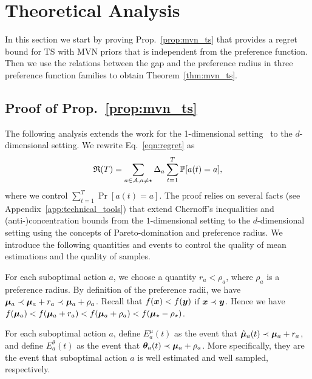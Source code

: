 
\section{Theoretical Analysis}
\label{sec:analysis}

In this section we start by proving Prop.~\ref{prop:mvn_ts} that provides a regret bound for TS with MVN priors that is independent from the preference function. Then we use the relations between the gap and the preference radius in three preference function families to obtain Theorem~\ref{thm:mvn_ts}.

\subsection{Proof of Prop.~\ref{prop:mvn_ts}}

The following analysis extends the work for the 1-dimensional setting~\cite{Agrawal2013} to the $d$-dimensional setting. We rewrite Eq.~\ref{eqn:regret} as
\begin{align*}
    \mathfrak{R}(T) = \sum_{a \in \mathcal{A}, a \neq \star} \Delta_a \sum_{t = 1}^T \mathbb{P}[a(t) = a],
\end{align*}
where we control $\sum_{t = 1}^T \Pr[a(t) = a]$. The proof relies on several facts (see Appendix~\ref{app:technical_tools}) that extend Chernoff's inequalities and (anti-)concentration bounds from the $1$-dimensional setting to the $d$-dimensional setting using the concepts of Pareto-domination and preference radius. We introduce the following quantities and events to control the quality of mean estimations and the quality of samples.

\begin{definition}[Quantities $r_a$]
    For each suboptimal action $a$, we choose a quantity $r_a < \rho_a$, where $\rho_a$ is a preference radius. By definition of the preference radii, we have $\boldsymbol{\mu}_a \prec \boldsymbol{\mu}_a + r_a \prec \boldsymbol{\mu}_a + \rho_a$. Recall that $f(\boldsymbol{x}) < f(\boldsymbol{y})$ if $\boldsymbol{x} \prec \boldsymbol{y}$. Hence we have $f(\boldsymbol{\mu}_a) < f(\boldsymbol{\mu}_a + r_a) < f(\boldsymbol{\mu}_a + \rho_a) < f(\boldsymbol{\mu}_\star - \rho_\star)$.
\end{definition}

\begin{definition}
    For each suboptimal action $a$, define $E_a^\mu(t)$ as the event that $\hat {\boldsymbol{\mu}}_a(t) \prec \boldsymbol{\mu}_a + r_a$, and define $E_a^\theta(t)$ as the event that $\boldsymbol{\theta}_a(t) \prec \boldsymbol{\mu}_a + \rho_a$. More specifically, they are the event that suboptimal action $a$ is well estimated and well sampled, respectively.
\end{definition}


